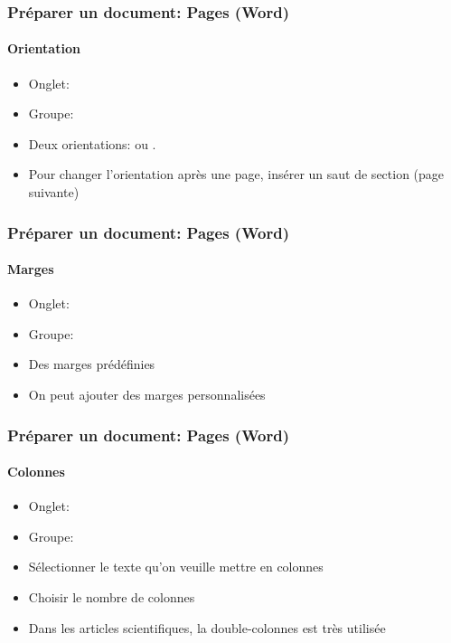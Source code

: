 \documentclass[xcolor=table]{beamer}
\begin{document}
\begin{frame}[t]
\frametitle{Préparer un document: Pages (Word)}
\framesubtitle{Orientation}

\begin{minipage}{0.44\textwidth}
	\begin{itemize}
		\item Onglet: 
		\item Groupe: 
		\item Deux orientations:  ou .
		\item Pour changer l'orientation après une page, insérer un saut de section (page suivante)
	\end{itemize}
\end{minipage}
\begin{minipage}{0.55\textwidth}
\end{minipage}

\end{frame}

\begin{frame}[t]
\frametitle{Préparer un document: Pages (Word)}
\framesubtitle{Marges}

\begin{minipage}{0.44\textwidth}
	\begin{itemize}
		\item Onglet: 
		\item Groupe: 
		\item Des marges prédéfinies
		\item On peut ajouter des marges personnalisées
	\end{itemize}
\end{minipage}
\begin{minipage}{0.55\textwidth}
\end{minipage}

\end{frame}

\begin{frame}[t]
\frametitle{Préparer un document: Pages (Word)}
\framesubtitle{Colonnes}

\begin{minipage}{0.44\textwidth}
	\begin{itemize}
		\item Onglet: 
		\item Groupe: 
		\item Sélectionner le texte qu'on veuille mettre en colonnes
		\item Choisir le nombre de colonnes 
		\item Dans les articles scientifiques, la double-colonnes est très utilisée
	\end{itemize}
\end{minipage}
\begin{minipage}{0.55\textwidth}
\end{minipage}

\end{frame}
\end{document}
